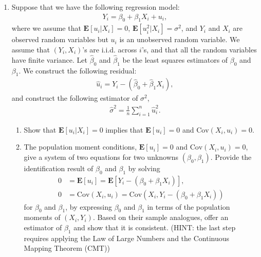 \documentclass[11pt]{article}
\newcommand{\Blue}{\color{blue}}
\begin{document}
\begin{enumerate}
	\item Suppose that we have the following regression model:
	\begin{eqnarray}
	\label{reg}
	Y_i = \beta_0 + \beta_1 X_i + u_i,
	\end{eqnarray}
	where we assume that $\mathbf{E}[u_i|X_i] = 0$, $\mathbf{E}[u_i^2|X_i] = \sigma^2$, and $Y_i$ and $X_i$ are observed random variables but $u_i$ is an unobserved random variable. We assume that $(Y_i,X_i)$'s are i.i.d. across $i$'s, and that all the random variables have finite variance. Let $\hat \beta_0$ and $\hat \beta_1$ be the least squares estimators of $\beta_0$ and $\beta_1$. We construct the following residual:
	\begin{eqnarray*}
		\hat u_i = Y_i - (\hat \beta_0 + \hat \beta_1 X_i),
	\end{eqnarray*}
	and construct the following estimator of $\sigma^2$,
	\begin{eqnarray*}
		\hat \sigma^2 = \frac{1}{n}\sum_{i=1}^n \hat u_i^2.
	\end{eqnarray*}
	\begin{enumerate}
	\item Show that $\mathbf{E}[u_i|X_i]=0$ implies that $\mathbf{E}[u_i]=0$ and $\text{Cov}(X_i,u_i)=0$.

	\item The population moment conditions, $\mathbf{E}[u_i]=0$ and $\text{Cov}(X_i,u_i)=0$, give  a system of two equations for two unknowns $(\beta_0,\beta_1)$. Provide the identification result of $\beta_0$ and $\beta_1$ by solving
	\begin{align*}
	0&=\mathbf{E}[u_i]=\mathbf{E}[Y_i - ( \beta_0 + \beta_1 X_i)],\\
	0&=\text{Cov}(X_i,u_i)=\text{Cov}(X_i,Y_i - ( \beta_0 + \beta_1 X_i))
	\end{align*}
	for $\beta_0$ and $\beta_1$, by expressing $\beta_0$ and $\beta_1$ in terms of the population moments of $(X_i,Y_i)$.  Based on their sample analogues, offer an estimator of   $\beta_1$ and show that it is consistent. (HINT: the last step requires applying the Law of Large Numbers and the Continuous Mapping Theorem (CMT)) %


\end{enumerate}
\end{enumerate}
\end{document}
